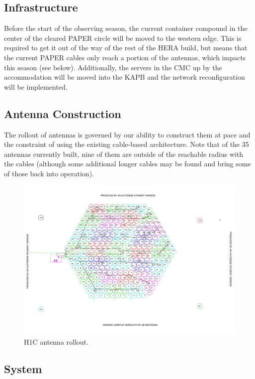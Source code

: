 \documentclass{article}
\begin{document}
\subsection{Infrastructure}
Before the start of the observing season, the current container compound in the center of the cleared PAPER circle will be moved to the western edge.  This is required to get it out of the way of the rest of the HERA build, but means that the current PAPER cables only reach a portion of the antennas, which impacts this season (see below).  Additionally, the servers in the CMC up by the accommodation will be moved into the KAPB and the network reconfiguration will be implemented.

\subsection{Antenna Construction}
The rollout of antennas is governed by our ability to construct them at pace and the constraint of using the existing cable-based architecture.  Note that of the 35 antennas currently built, nine of them are outside of the reachable radius with the cables (although some additional longer cables may be found and bring some of those back into operation).

\begin{figure}
\includegraphics[width=\textwidth]{heraSite.pdf} %
\caption{H1C antenna rollout.}
\end{figure}

\subsection{System}
\end{document}
